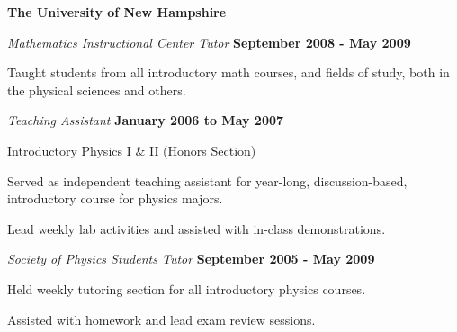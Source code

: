 \documentclass[10pt]{article}
\newenvironment{outerlist}[1][\enskip\textbullet]%
        {\begin{itemize}[#1]}{\end{itemize}%
         \vspace{-.6\baselineskip}}
\newenvironment{innerlist}[1][\enskip\textbullet]%
        {\begin{compactitem}[#1]}{\end{compactitem}}
\begin{document}
\vspace{1.3\baselineskip}

\textbf{The University of New Hampshire}
\begin{outerlist}
\item[] \textit{Mathematics Instructional Center Tutor}%
    \hfill \textbf{September 2008 - May 2009}
    \begin{innerlist}
        \item Taught students from all introductory math courses, and fields of study, both in the physical sciences and others. 
    \end{innerlist}
\item[] \textit{Teaching Assistant}%
    \hfill \textbf{January 2006 to May 2007}
    \begin{innerlist}
        \item Introductory Physics I \& II (Honors Section)
        \begin{innerlist}
            \item Served as independent teaching assistant for year-long, discussion-based, introductory course for physics majors.
            \item Lead weekly lab activities and assisted with in-class demonstrations.
        \end{innerlist}
    \end{innerlist}
\item[] \textit{Society of Physics Students Tutor}%
    \hfill \textbf{September 2005 - May 2009}
    \begin{innerlist}
        \item Held weekly tutoring section for all introductory physics courses.
        \item Assisted with homework and lead exam review sessions.
    \end{innerlist}
\end{outerlist}
\end{document}
